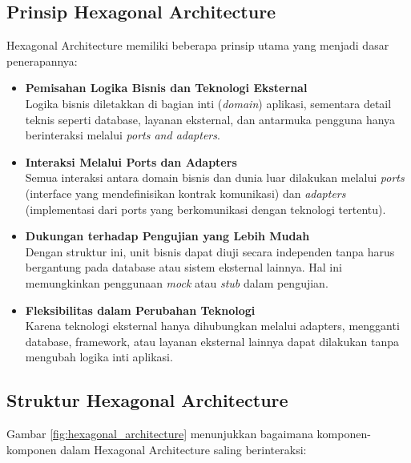 \subsection{Prinsip Hexagonal Architecture}

Hexagonal Architecture memiliki beberapa prinsip utama yang menjadi dasar penerapannya:

\begin{itemize}
	\item \textbf{Pemisahan Logika Bisnis dan Teknologi Eksternal} \\
	Logika bisnis diletakkan di bagian inti (\textit{domain}) aplikasi, sementara detail teknis seperti database, layanan eksternal, dan antarmuka pengguna hanya berinteraksi melalui \textit{ports and adapters}.
	
	\item \textbf{Interaksi Melalui Ports dan Adapters} \\
	Semua interaksi antara domain bisnis dan dunia luar dilakukan melalui \textit{ports} (interface yang mendefinisikan kontrak komunikasi) dan \textit{adapters} (implementasi dari ports yang berkomunikasi dengan teknologi tertentu).
	
	\item \textbf{Dukungan terhadap Pengujian yang Lebih Mudah} \\
	Dengan struktur ini, unit bisnis dapat diuji secara independen tanpa harus bergantung pada database atau sistem eksternal lainnya. Hal ini memungkinkan penggunaan \textit{mock} atau \textit{stub} dalam pengujian.
	
	\item \textbf{Fleksibilitas dalam Perubahan Teknologi} \\
	Karena teknologi eksternal hanya dihubungkan melalui adapters, mengganti database, framework, atau layanan eksternal lainnya dapat dilakukan tanpa mengubah logika inti aplikasi.
\end{itemize}

\subsection{Struktur Hexagonal Architecture}

Gambar \ref{fig:hexagonal_architecture} menunjukkan bagaimana komponen-komponen dalam Hexagonal Architecture saling berinteraksi:

